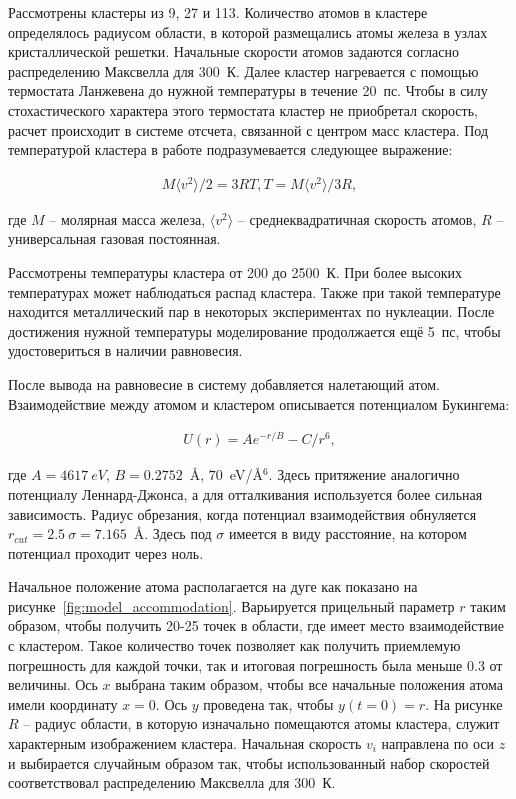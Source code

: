 Рассмотрены кластеры из 9, 27 и 113. Количество атомов в кластере определялось радиусом области, в которой размещались атомы железа в узлах кристаллической решетки. Начальные скорости атомов задаются согласно распределению Максвелла для 300~К. Далее кластер нагревается с помощью термостата Ланжевена до нужной температуры в течение 20~пс. Чтобы в силу стохастического характера этого термостата кластер не приобретал скорость, расчет происходит в системе отсчета, связанной с центром масс кластера. Под температурой кластера в работе подразумевается следующее выражение:

\begin{align}
	M \langle v^2 \rangle /2 = 3 R T, T = M \langle v^2 \rangle / 3 R,
\end{align}

где $M$ \--- молярная масса железа, $\langle v^2 \rangle$ \--- среднеквадратичная скорость атомов, $R$ \--- универсальная газовая постоянная.

Рассмотрены температуры кластера от 200 до 2500~К. При более высоких температурах может наблюдаться распад кластера. Также при такой температуре находится металлический пар в некоторых экспериментах по нуклеации. После достижения нужной температуры моделирование продолжается ещё 5~пс, чтобы удостовериться в наличии равновесия. 

После вывода на равновесие в систему добавляется налетающий атом. Взаимодействие между атомом и кластером описывается потенциалом Букингема:

\begin{align}
	U(r) = A e^{-r/B} - C/r^6,
\end{align}

где $A = 4617~eV$, $B=0.2752$~\AA, $70$~eV/\AA$^6$. Здесь притяжение аналогично потенциалу Леннард-Джонса, а для отталкивания используется более сильная зависимость. Радиус обрезания, когда потенциал взаимодействия обнуляется $r_{cut} = 2.5~\sigma = 7.165$~\AA. Здесь под $\sigma$ имеется в виду расстояние, на котором потенциал проходит через ноль.

Начальное положение атома располагается на дуге как показано на рисунке~\cref{fig:model_accommodation}. Варьируется прицельный параметр $r$ таким образом, чтобы получить 20-25 точек в области, где имеет место взаимодействие с кластером. Такое количество точек позволяет как получить приемлемую погрешность для каждой точки, так и итоговая погрешность была меньше 0.3 от величины. Ось $x$ выбрана таким образом, чтобы все начальные положения атома имели координату $x = 0$. Ось $y$ проведена так, чтобы $y(t=0) = r$. На рисунке $R$ \--- радиус области, в которую изначально помещаются атомы кластера, служит характерным изображением кластера. Начальная скорость $v_i$ направлена по оси $z$ и выбирается случайным образом так, чтобы использованный набор скоростей соответствовал распределению Максвелла для 300~К. 

